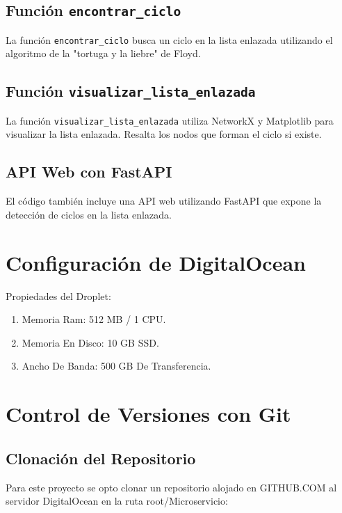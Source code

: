 \documentclass[journal, spanish]{IEEEtran}
\begin{document}


\subsection{Función \texttt{encontrar\_ciclo}}
La función \texttt{encontrar\_ciclo} busca un ciclo en la lista enlazada utilizando el algoritmo de la "tortuga y la liebre" de Floyd.



\subsection{Función \texttt{visualizar\_lista\_enlazada}}
La función \texttt{visualizar\_lista\_enlazada} utiliza NetworkX y Matplotlib para visualizar la lista enlazada. Resalta los nodos que forman el ciclo si existe.



\subsection{API Web con FastAPI}
El código también incluye una API web utilizando FastAPI que expone la detección de ciclos en la lista enlazada.



\section{Configuración de DigitalOcean}
Propiedades del Droplet:
\begin{enumerate}
    \item Memoria Ram: 512 MB / 1 CPU.
     \item Memoria En Disco: 10 GB SSD.
    \item Ancho De Banda: 500 GB De Transferencia.
\end{enumerate}

\section{Control de Versiones con Git}

\subsection{Clonación del Repositorio}
Para este proyecto se opto clonar un repositorio alojado en GITHUB.COM al servidor DigitalOcean en la ruta root/Microservicio:
\end{document}
